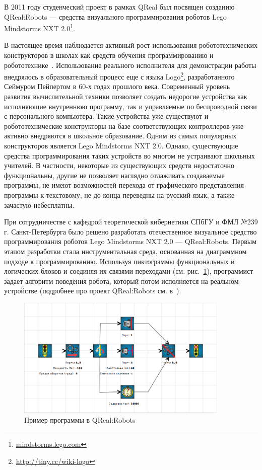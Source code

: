 \documentclass[a4paper]{article}
\begin{document}
В 2011 году студенческий проект в рамках QReal был посвящен созданию QReal:Robots --- средства визуального программирования роботов Lego Mindstorms NXT 2.0\footnote{\url{mindstorms.lego.com}}. 

В настоящее время наблюдается активный рост использования робототехнических конструкторов в школах как средств обучения программированию и робототехнике~\cite{filippov}.  Использование реального исполнителя для демонстрации работы внедрялось в образовательный процесс еще с языка Logo\footnote{\url{http://tiny.cc/wiki-logo}}, разработанного Сеймуром Пейпертом в 60-х годах прошлого века. Современный уровень развития вычислительной техники позволяет создать недорогие устройства как исполняющие внутреннюю программу, так и управляемые по беспроводной связи с персонального компьютера. Такие устройства уже существуют и робототехнические конструкторы на базе соответствующих контроллеров уже активно внедряются в школьное образование. Одним из самых популярных конструкторов является Lego Mindstorms NXT 2.0. Однако, существующие средства программирования таких устройств во многом не устраивают школьных учителей. В частности, некоторые из существующих средств недостаточно функциональны, другие не позволяет наглядно отлаживать создаваемые программы, не имеют возможностей перехода от графического представления программы к текстовому, не до конца переведны на русский язык, а также зачастую небесплатны.

При сотрудничестве с кафедрой теоретической кибернетики СПбГУ и ФМЛ №239 г. Санкт-Петербурга было решено разработать отечественное визуальное средство программирования роботов Lego Mindstorms NXT 2.0 --- QReal:Robots. Первым этапом разработки стала инструментальная среда, основанная на диаграммном подходе к программированию. Используя пиктограммы функциональных и логических блоков и соединяя их связями-переходами (см. рис.~\ref{qreal-robots}), программист задает алгоритм поведения робота, который потом исполняется на реальном устройстве (подробнее про проект QReal:Robots см. в~\cite{robots}).

\begin{figure} [ht]
  \begin{center}
    \includegraphics[width=0.9\textwidth]{02-qreal-robots.png}
    \caption{Пример программы в QReal:Robots}
    \label{qreal-robots}
  \end{center}
\end{figure}
\end{document}
